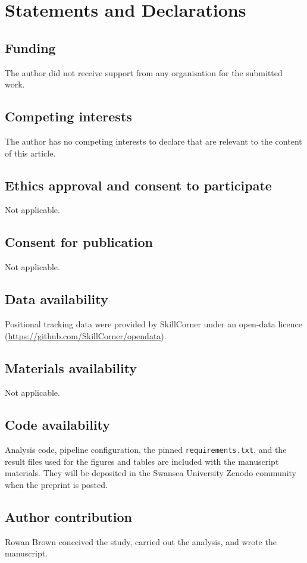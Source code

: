 \section*{Statements and Declarations}

\subsection*{Funding}
The author did not receive support from any organisation for the submitted work.

\subsection*{Competing interests}
The author has no competing interests to declare that are relevant to the content of this article.

\subsection*{Ethics approval and consent to participate}
Not applicable.

\subsection*{Consent for publication}
Not applicable.

\subsection*{Data availability}
Positional tracking data were provided by SkillCorner under an open-data licence (\url{https://github.com/SkillCorner/opendata}).

\subsection*{Materials availability}
Not applicable.

\subsection*{Code availability}
Analysis code, pipeline configuration, the pinned \texttt{requirements.txt}, and the result files used for the figures and tables are included with the manuscript materials. They will be deposited in the Swansea University Zenodo community when the preprint is posted.

\subsection*{Author contribution}
Rowan Brown conceived the study, carried out the analysis, and wrote the manuscript.
